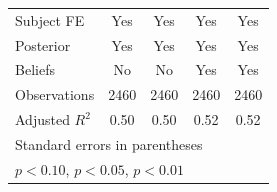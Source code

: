 {\begin{tabular}{l*{4}{c}}
Subject FE      &      Yes         &      Yes         &      Yes         &      Yes         \\
Posterior       &      Yes         &      Yes         &      Yes         &      Yes         \\
Beliefs         &       No         &       No         &      Yes         &      Yes         \\
\hline
Observations    &     2460         &     2460         &     2460         &     2460         \\
Adjusted \(R^{2}\)&     0.50         &     0.50         &     0.52         &     0.52         \\
\hline\hline
\multicolumn{5}{l}{\footnotesize Standard errors in parentheses}\\
\multicolumn{5}{l}{\footnotesize \sym{*} \(p<0.10\), \sym{**} \(p<0.05\), \sym{***} \(p<0.01\)}\\
\end{tabular}
}
